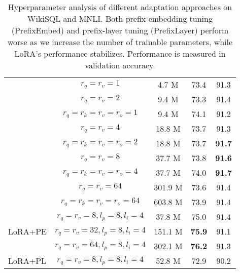 \begin{table}[h]
\begin{tabular}{l|c|c|c|c}
                             & $r_q=r_v=1 $ & 4.7 M & 73.4 & 91.3 \\
                             & $r_q=r_v=2 $ & 9.4 M & 73.3 & 91.4 \\
                             & $r_q=r_k=r_v=r_o=1$ & 9.4 M & 74.1 & 91.2 \\
                             & $r_q=r_v=4 $ & 18.8 M & 73.7 & 91.3 \\
                             & $r_q=r_k=r_v=r_o=2$ & 18.8 M & 73.7 & \textbf{91.7} \\
                             & $r_q=r_v=8$ & 37.7 M & 73.8 & \textbf{91.6} \\
                             & $r_q=r_k=r_v=r_o=4$ & 37.7 M & 74.0 & \textbf{91.7} \\
                             & $r_q=r_v=64$ & 301.9 M & 73.6 & 91.4 \\
                             & $r_q=r_k=r_v=r_o=64$ & 603.8 M & 73.9 & 91.4 \\
\midrule
\multirow{3}{*}{LoRA+PE}     & $r_q=r_v=8, l_p=8, l_i=4$ & 37.8 M & 75.0 & 91.4\\
                             & $r_q=r_v=32, l_p=8, l_i=4$ &151.1 M & \textbf{75.9} & 91.1\\
                             & $r_q=r_v=64, l_p=8, l_i=4$ &302.1 M & \textbf{76.2}  & 91.3\\
\midrule
\multirow{1}{*}{LoRA+PL} & $r_q=r_v=8, l_p=8, l_i=4$ & 52.8 M & 72.9 & 90.2\\
\bottomrule
\end{tabular}
\caption{Hyperparameter analysis of different adaptation approaches on WikiSQL and MNLI. Both prefix-embedding tuning (PrefixEmbed) and prefix-layer tuning (PrefixLayer) perform worse as we increase the number of trainable parameters, while LoRA's performance stabilizes. Performance is measured in validation accuracy.}
\label{tab:gpt3_ft_results_detailed}
\end{table}




